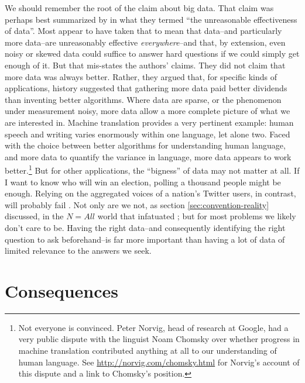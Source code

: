 \documentclass[12pt]{article}
\begin{document}
We should remember the root of the claim about big data. That claim
was perhaps best summarized by \cite{halevy2009unreasonable} in what
they termed ``the unreasonable effectiveness of data''. Most appear to
have
taken that to mean that data--and particularly more data--are
unreasonably effective \textit{everywhere}--and that, by extension,
even noisy or skewed data could suffice to answer hard questions if we
could simply get enough of it. But that mis-states the authors'
claims. They did not claim that more data was always better. Rather,
they argued that, for specific kinds
of applications, history suggested that gathering more data paid better
dividends than inventing better algorithms. Where data are sparse, or
the phenomenon under measurement noisy, more data allow a more
complete picture of what we are interested in. Machine translation
provides a very pertinent example: human speech and writing varies
enormously within one language, let alone two. Faced with the choice
between better algorithms for understanding human language, and more
data to quantify the variance in language, more data appears to work
better.\footnote{Not everyone is convinced. Peter Norvig, head of
  research at Google, had a very public dispute with the linguist Noam
Chomsky over whether progress in machine translation contributed
anything at all to our understanding of human language. See
\url{http://norvig.com/chomsky.html} for Norvig's account of this
dispute and a link to Chomsky's position.} But for other applications, the ``bigness'' of data may not matter at
all. If I want to know who will win an election, polling a thousand
people might be enough. Relying on the aggregated voices of a nation's
Twitter users, in contrast, will probably
fail \citep{gayo2011limits,gayo2012wanted,huberty2013}. Not only are
we not, as section \ref{sec:convention-reality} discussed, 
in the $N=All$ world that infatuated
\cite{mayer2013big}; but for most problems we likely don't
care to be. Having the right data--and consequently identifying the right
question to ask beforehand--is far more important than having a lot of
data of limited relevance to the answers we seek.


\section{Consequences}
\label{sec:consequences}
\end{document}
